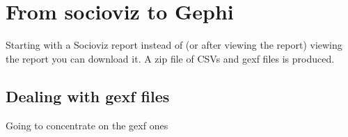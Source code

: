 \chapter{From socioviz to Gephi}
Starting with a Socioviz report instead of (or after viewing the report) viewing the report you can download it. A zip file of CSVs and gexf files is produced. \paragraph{}

\section{Dealing with gexf files}Going to concentrate on the gexf ones\paragraph{}

